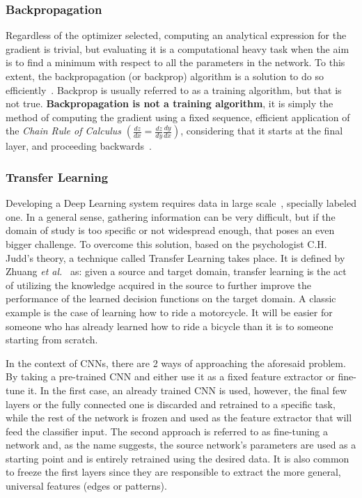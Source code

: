 \documentclass[class=report, crop=false, a4paper, 12pt]{standalone}
\begin{document}
\subsubsection{Backpropagation}
\par Regardless of the optimizer selected, computing an analytical expression for the gradient is trivial, but evaluating it is a computational heavy task when the aim is to find a minimum with respect to all the parameters in the network. To this extent, the backpropagation (or backprop) algorithm is a solution to do so efficiently~\autocite{6795724}. Backprop is usually referred to as a training algorithm, but that is not true. \textbf{Backpropagation is not a training algorithm}, it is simply the method of computing the gradient using a fixed sequence, efficient application of the \textit{Chain Rule of Calculus} $\left(\frac{dz}{dx} = \frac{dz}{dy}\frac{dy}{dx}\right)$, considering that it starts at the final layer, and proceeding backwards~\autocite{Goodfellow-et-al-2016}. 

\label{transf learning}
\subsubsection{Transfer Learning} %
\par Developing a Deep Learning system requires data in large scale~\autocite{parkhiDeepFaceRecognition2015}, specially labeled one. In a general sense, gathering information can be very difficult, but if the domain of study is too specific or not widespread enough, that poses an even bigger challenge. To overcome this solution, based on the psychologist C.H. Judd's theory, a technique called Transfer Learning takes place. It is defined by Zhuang \textit{et al.}~\autocite{zhuangComprehensiveSurveyTransfer2020} as: given a source and target domain, transfer learning is the act of utilizing the knowledge acquired in the source to further improve the performance of the learned decision functions on the target domain. A classic example is the case of learning how to ride a motorcycle. It will be easier for someone who has already learned how to ride a bicycle than it is to someone starting from scratch.
\par In the context of CNNs, there are 2 ways of approaching the aforesaid problem. By taking a pre-trained CNN and either use it as a fixed feature extractor or fine-tune it. In the first case, an already trained CNN is used, however, the final few layers or the fully connected one is discarded and retrained to a specific task, while the rest of the network is frozen and used as the feature extractor that will feed the classifier input. The second approach is referred to as fine-tuning a network and, as the name suggests, the source network's parameters are used as a starting point and is entirely retrained using the desired data. It is also common to freeze the first layers since they are responsible to extract the more general, universal features (edges or patterns).
\end{document}
